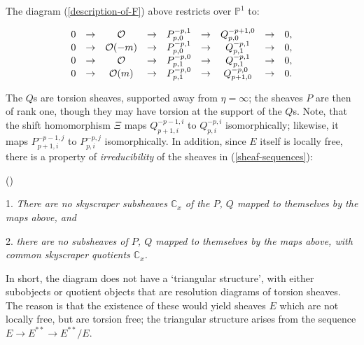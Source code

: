 \documentclass[12pt]{article}
\theoremstyle{definition}
\theoremstyle{remark}
\numberwithin{theorem}{section}
\def\bC{{\mathbb {C}}}
\def\bP{{\mathbb {P}}}
\def\pO{{\mathcal O}}
\begin{document}
 The diagram (\ref{description-of-F}) above restricts over $\bP^1$ to:

\begin{equation}\label{sheaf-sequences} 
\begin{matrix}
0&\rightarrow& \pO &\rightarrow& P_{p,0}^{-p,1}& \rightarrow& Q_{p,0}^{-p+1,0}&\rightarrow&0,\cr
0&\rightarrow& \pO(-m)&\rightarrow& P_{p,0}^{-p,1}& \rightarrow& Q_{p,1}^{-p ,1}&\rightarrow&0,  \cr
0&\rightarrow& \pO &\rightarrow& P_{p,1}^{-p,0}&  \rightarrow& Q_{p,1}^{-p ,1}&\rightarrow&0, \cr
0&\rightarrow& \pO(m) &\rightarrow& P_{p,1}^{-p,0}&  \rightarrow& Q_{p+1,0}^{-p,0}&\rightarrow&0.  \cr
\end{matrix}
\end{equation}

The $Q$s are torsion sheaves, supported away from $\eta=\infty$; the sheaves $P$ are then of rank one, though they may have torsion at the support of the $Q$s. Note, that the shift homomorphism $\Xi$ maps   $Q_{p+1,i}^{-p-1 ,i}$ to $Q_{p,i}^{-p ,i}$  isomorphically; likewise, it 
maps   $P_{p+1,i}^{-p-1,j}$ to  $P_{p,i}^{-p,j}$ isomorphically. In addition, since $E$ itself is locally free, there is a property of {\it irreducibility} of the sheaves in (\ref{sheaf-sequences}): 
\bigskip

\label{IrredCond} (\cite[page following lemma 9]{Charbonneau:2006gu}) 

1. {\it There are no skyscraper subsheaves $\bC_x$ of the $P $, $Q$ mapped to themselves by the maps above, and}

2. {\it there are no subsheaves of $P$, $Q$ mapped to themselves by the maps above, with common   skyscraper quotients $\bC_x$.}

\medskip

In short, the diagram does not have a `triangular structure', with either subobjects or quotient objects that  are resolution diagrams of torsion sheaves. The reason is that the existence of these would yield    sheaves $E$ which are not locally free, but are torsion free; the triangular structure arises from the sequence $E\rightarrow E^{**}\rightarrow E^{**}/E.$
\end{document}
